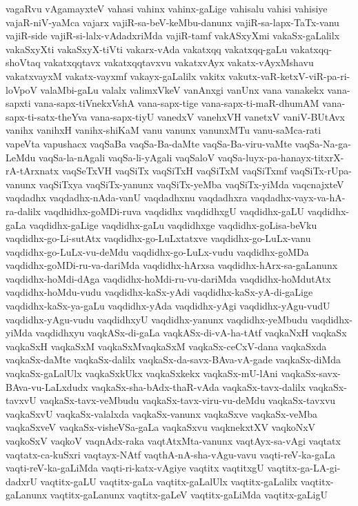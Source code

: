 {vagaRvu
vAgamayxteV
vahasi
vahinx
vahinx-gaLige
vahisalu
vahisi
vahisiye
vajaR-niV-yaMca
vajarx
vajiR-sa-beV-keMbu-danunx
vajiR-sa-lapx-TaTx-vanu
vajiR-side
vajiR-si-lalx-vAdadxriMda
vajiR-tamf
vakASxyXmi
vakaSx-gaLalilx
vakaSxyXti
vakaSxyX-tiVti
vakarx-vAda
vakatxqq
vakatxqq-gaLu
vakatxqq-shoVtaq
vakatxqqtavx
vakatxqqtavxvu
vakatxvAyx
vakatx-vAyxMshavu
vakatxvayxM
vakatx-vayxmf
vakayx-gaLalilx
vakitx
vakutx-vaR-ketxV-viR-pa-ri-loVpoV
valaMbi-gaLu
valalx
valimxVkeV
vanAnxgi
vanUnx
vana
vanakekx
vana-sapxti
vana-sapx-tiVnekxVshA
vana-sapx-tige
vana-sapx-ti-maR-dhumAM
vana-sapx-ti-satx-theYva
vana-sapx-tiyU
vanedxV
vanehxVH
vanetxV
vaniV-BUtAvx
vanihx
vanihxH
vanihx-shiKaM
vanu
vanunx
vanunxMTu
vanu-saMca-rati
vapeVta
vapushacx
vaqSaBa
vaqSa-Ba-daMte
vaqSa-Ba-viru-vaMte
vaqSa-Na-ga-LeMdu
vaqSa-la-nAgali
vaqSa-li-yAgali
vaqSaloV
vaqSa-luyx-pa-hanayx-titxrX-rA-tArxnatx
vaqSeTxVH
vaqSiTx
vaqSiTxH
vaqSiTxM
vaqSiTxmf
vaqSiTx-rUpa-vanunx
vaqSiTxya
vaqSiTx-yanunx
vaqSiTx-yeMba
vaqSiTx-yiMda
vaqcnajxteV
vaqdadhx
vaqdadhx-nAda-vanU
vaqdadhxnu
vaqdadhxra
vaqdadhx-vayx-va-hA-ra-dalilx
vaqdhidhx-goMDi-ruva
vaqdidhx
vaqdidhxgU
vaqdidhx-gaLU
vaqdidhx-gaLa
vaqdidhx-gaLige
vaqdidhx-gaLu
vaqdidhxge
vaqdidhx-goLisa-beVku
vaqdidhx-go-Li-sutAtx
vaqdidhx-go-LuLxtatxve
vaqdidhx-go-LuLx-vanu
vaqdidhx-go-LuLx-vu-deMdu
vaqdidhx-go-LuLx-vudu
vaqdidhx-goMDa
vaqdidhx-goMDi-ru-va-dariMda
vaqdidhx-hArxsa
vaqdidhx-hArx-sa-gaLanunx
vaqdidhx-hoMdi-dAga
vaqdidhx-hoMdi-ru-vu-dariMda
vaqdidhx-hoMdutAtx
vaqdidhx-hoMdu-vudu
vaqdidhx-kaSx-yAdi
vaqdidhx-kaSx-yA-di-gaLige
vaqdidhx-kaSx-ya-gaLu
vaqdidhx-yAda
vaqdidhx-yAgi
vaqdidhx-yAgu-vudU
vaqdidhx-yAgu-vudu
vaqdidhxyU
vaqdidhx-yanunx
vaqdidhx-yeMbudu
vaqdidhx-yiMda
vaqdidhxyu
vaqkASx-di-gaLa
vaqkASx-di-vA-ha-tAtf
vaqkaNxH
vaqkaSx
vaqkaSxH
vaqkaSxM
vaqkaSxMvaqkaSxM
vaqkaSx-ceCxV-dana
vaqkaSxda
vaqkaSx-daMte
vaqkaSx-dalilx
vaqkaSx-da-savx-BAva-vA-gade
vaqkaSx-diMda
vaqkaSx-gaLalUlx
vaqkaSxkUkx
vaqkaSxkekx
vaqkaSx-mU-lAni
vaqkaSx-savx-BAva-vu-LaLxdudx
vaqkaSx-sha-bAdx-thaR-vAda
vaqkaSx-tavx-dalilx
vaqkaSx-tavxvU
vaqkaSx-tavx-veMbudu
vaqkaSx-tavx-viru-vu-deMdu
vaqkaSx-tavxvu
vaqkaSxvU
vaqkaSx-valalxda
vaqkaSx-vanunx
vaqkaSxve
vaqkaSx-veMba
vaqkaSxveV
vaqkaSx-visheVSa-gaLa
vaqkaSxvu
vaqknekxtXV
vaqkoNxV
vaqkoSxV
vaqkoV
vaqnAdx-raka
vaqtAtxMta-vanunx
vaqtAyx-sa-vAgi
vaqtatx
vaqtatx-ca-kuSxri
vaqtayx-NAtf
vaqthA-nA-sha-vAgu-vavu
vaqti-reV-ka-gaLa
vaqti-reV-ka-gaLiMda
vaqti-ri-katx-vAgiye
vaqtitx
vaqtitxgU
vaqtitx-ga-LA-gi-dadxrU
vaqtitx-gaLU
vaqtitx-gaLa
vaqtitx-gaLalUlx
vaqtitx-gaLalilx
vaqtitx-gaLanunx
vaqtitx-gaLanunx
vaqtitx-gaLeV
vaqtitx-gaLiMda
vaqtitx-gaLigU
}
